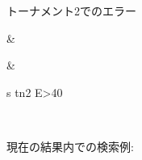 \documentclass[letterpaper,10pt,dvipdfmx]{sphinxmanual}
\begin{document}
\begin{savenotes}
\begin{tabular}[t]{}
\begin{varwidth}[t]{}
\sphinxAtStartPar
トーナメント2でのエラー
\sphinxbeforeendvarwidth
\end{varwidth}%
&\begin{varwidth}[t]{}
\sphinxbeforeendvarwidth
\end{varwidth}%
&\begin{varwidth}[t]{}
\sphinxAtStartPar
s tn2 E\textgreater{}40
\sphinxbeforeendvarwidth
\end{varwidth}%
\\
\sphinxbottomrule
\end{tabular}
\sphinxtableafterendhook\par
\sphinxattableend\end{savenotes}

\sphinxAtStartPar
現在の結果内での検索例:
\end{document}
